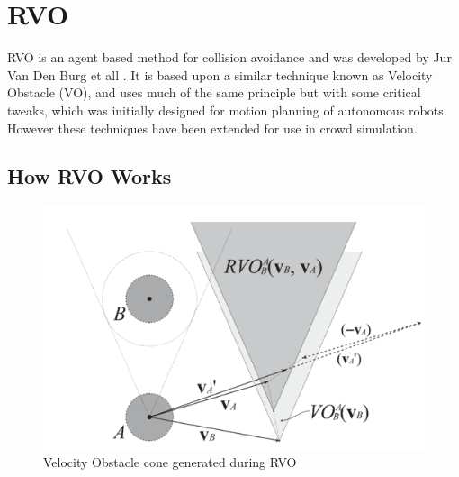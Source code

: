 \documentclass[a4paper,twocolumn]{article}
\begin{document}
\section{RVO}
RVO  is an agent based method for collision avoidance and was developed by Jur Van Den Burg et all \cite{JBerg2008RVO}. It is based upon a similar technique known as Velocity Obstacle (VO), and uses much of the same principle but with some critical tweaks, which was initially designed for motion planning of autonomous robots. However these techniques have been extended for use in crowd  simulation.\\


\subsection{How RVO Works}
\begin{figure}[b]
\includegraphics[scale=0.4]{images/rvoDiagram.png}
\caption{Velocity Obstacle cone generated during RVO}
\label{fig:rvoCone}
\end{figure}
\end{document}
